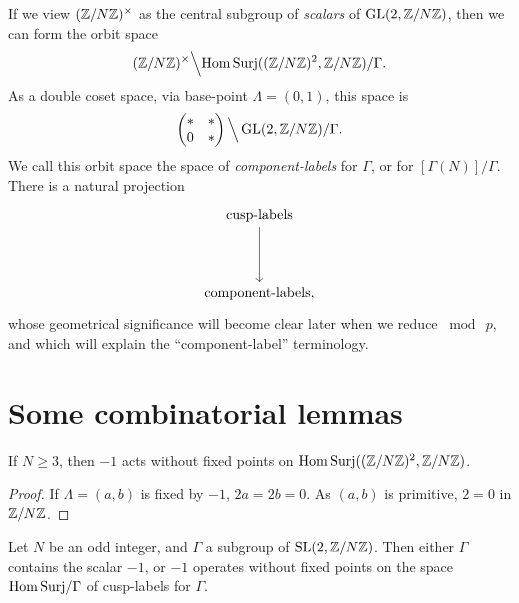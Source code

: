 If we view $(\mathbb{Z}/N\mathbb{Z})^\times$ as the central subgroup of \emph{scalars} of $\operatorname{GL}(2,\mathbb{Z}/N\mathbb{Z})$, then we can form the orbit space
\[
(\mathbb{Z}/N\mathbb{Z})^\times \Big\backslash \mathrm{Hom\,Surj}((\mathbb{Z}/N\mathbb{Z})^2, \mathbb{Z}/N\mathbb{Z})/\Gamma .
\]
As a double coset space, via base-point $\Lambda = (0,1)$, this space is
\[
\begin{pmatrix} * & * \\ 0 & * \end{pmatrix} \Big\backslash \operatorname{GL}(2,\mathbb{Z}/N\mathbb{Z})/\Gamma .
\]
We call this orbit space the space of \emph{component-labels} for $\Gamma$, or for $[\Gamma(N)]/\Gamma$. There is a natural projection
\begin{equation*}
\begin{tikzcd}[row sep=4em]
\text{cusp-labels} \arrow[d] \\
\text{component-labels} ,
\end{tikzcd}
\end{equation*}
whose geometrical significance will become clear later when we reduce $\bmod\ p$, and which will explain the ``component-label'' terminology.

\section{Some combinatorial lemmas}
\label{sec:10.7}

\begin{klem}\label{lem:10.7.1}
If $N \ge 3$, then $-1$ acts without fixed points on $\mathrm{Hom\,Surj}((\mathbb{Z}/N\mathbb{Z})^2, \mathbb{Z}/N\mathbb{Z})$.
\end{klem}

\begin{proof}
If $\Lambda = (a,b)$ is fixed by $-1$, $2a = 2b = 0$. As $(a,b)$ is primitive, $2 = 0$ in $\mathbb{Z}/N\mathbb{Z}$.
\end{proof}

\begin{klem}\label{lem:10.7.2}
Let $N$ be an odd integer, and $\Gamma$ a subgroup of $\operatorname{SL}(2,\mathbb{Z}/N\mathbb{Z})$. Then either $\Gamma$ contains the scalar $-1$, or $-1$ operates without fixed points on the space $\mathrm{Hom\,Surj}/\Gamma$ of cusp-labels for $\Gamma$.
\end{klem}

